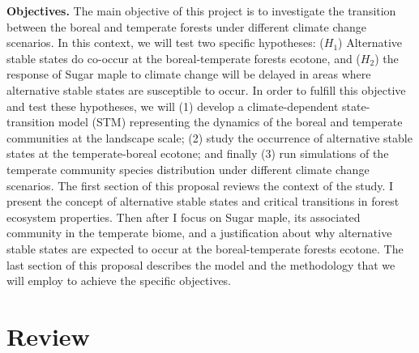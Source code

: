 \textbf{Objectives.} The main objective of this project is to investigate the
transition between the boreal and temperate forests under different climate
change scenarios. In this context, we will test two specific hypotheses:
($H_1$) Alternative stable states do co-occur at the boreal-temperate forests
ecotone, and ($H_2$) the response of Sugar maple to climate change will be
delayed in areas where alternative stable states are susceptible to occur.
In order to fulfill this objective and test these hypotheses, we will (1)
develop a climate-dependent state-transition model (STM) representing the
dynamics of the boreal and temperate communities at the landscape scale; (2) study
the occurrence of alternative stable states at the temperate-boreal ecotone;
and finally (3) run simulations of the temperate community species
distribution under different climate change scenarios. The first section of
this proposal reviews the context of the study. I  
present the concept of alternative stable states and critical transitions in
forest ecosystem properties. Then after I focus on Sugar maple, its
associated community in the temperate biome, and a justification about why
alternative stable states are expected to occur at the boreal-temperate
forests ecotone. The last section of this proposal describes the model and the
methodology that we will employ to achieve the specific objectives.

\section{Review} 

